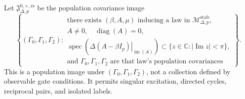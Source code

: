 Let \(\mathfrak J_{\Delta,p}^{0,+,\mathrm{rs}}\) be the population covariance image
\[
 \left\{(\Gamma_0,\Gamma_1,\Gamma_2):\begin{array}{l}
 \text{there exists }(\beta,A,\mu)\text{ inducing a law in }\mathcal M_{\Delta,p}^{\mathrm{stab}},\\
 A\neq0,\quad \operatorname{diag}(A)=0,\\
 \operatorname{spec}\!\left(
 \left.\Delta(A-\beta I_p)\right|_{\operatorname{im}(A)}\right)
 \subset\{z\in\mathbb C:|\operatorname{Im}z|<\pi\},\\
 \text{and }\Gamma_0,\Gamma_1,\Gamma_2\text{ are that law's population covariances}
 \end{array}\right\}.
\]
This is a population image under \((\Gamma_0,\Gamma_1,\Gamma_2)\), not a collection defined by observable gate conditions.  It permits singular excitation, directed cycles, reciprocal pairs, and isolated labels.